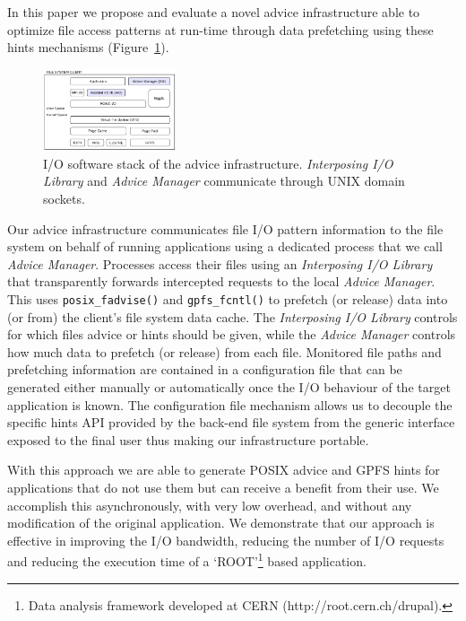 \documentclass[conference]{IEEEtran}
\begin{document}
In this paper we propose and evaluate a novel advice infrastructure able to optimize file access patterns at run-time through data prefetching using these hints mechanisms (Figure~\ref{figure: softwarestack}). 
\begin{figure}[!htb]
  \centering
  \includegraphics[width=0.35\textwidth]{../figures/softwarestack}
  \caption{I/O software stack of the advice infrastructure. \textit{Interposing I/O Library} and \textit{Advice Manager} communicate through UNIX domain sockets. %
  }
  \label{figure: softwarestack}
\end{figure}
Our advice infrastructure communicates file I/O pattern information to the file system on behalf of running applications using a dedicated process that we call \textit{Advice Manager}. Processes access their files using an \textit{Interposing I/O Library} that transparently forwards intercepted requests to the local \textit{Advice Manager}. This uses \texttt{posix\_fadvise()} and \texttt{gpfs\_fcntl()} to prefetch (or release) data into (or from) the client's file system data cache. The \textit{Interposing I/O Library} controls for which files advice or hints should be given, while the \textit{Advice Manager} controls how much data to prefetch (or release) from each file. Monitored file paths and prefetching information are contained in a configuration file that can be generated either manually or automatically once the I/O behaviour of the target application is known. The configuration file mechanism allows us to decouple the specific hints API provided by the back-end file system from the generic interface exposed to the final user thus making our infrastructure portable.

With this approach we are able to generate POSIX advice and GPFS hints for applications that do not use them but can receive a benefit from their use. We accomplish this asynchronously, with very low overhead, and without any modification of the original application. We demonstrate that our approach is effective in improving the I/O bandwidth, reducing the number of I/O requests and reducing the execution time of a `ROOT'\footnote{Data analysis framework developed at CERN (http://root.cern.ch/drupal).} based application.
\end{document}
